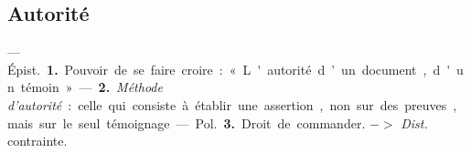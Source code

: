 \subsection{Autorité}
 — \si{Épist.} {\bf 1.} Pouvoir de se
faire croire : « L'autorité d’un document, d'un témoin ».

 — {\bf 2.} {\it Méthode
d'autorité} : celle qui consiste à établir
une assertion, non sur des preuves,
mais sur le seul témoignage.

— \si{Pol.} {\bf 3.} Droit de commander.
$->$ {\it Dist.} contrainte.

